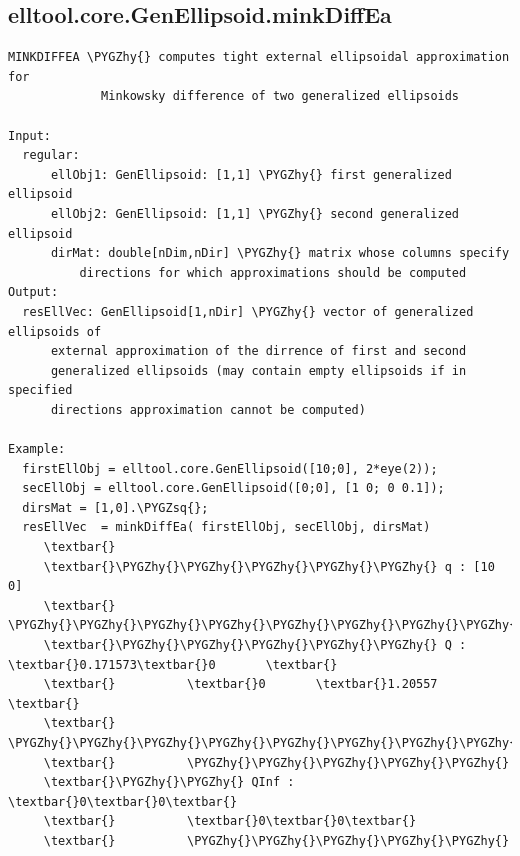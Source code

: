 \documentclass[letterpaper,10pt,english]{sphinxmanual}
\def\PYGZhy{\char`\-}
\def\PYGZsq{\char`\'}
\begin{document}
\subsection{elltool.core.GenEllipsoid.minkDiffEa}
\label{chap_functions:elltool-core-genellipsoid-minkdiffea}
\begin{Verbatim}[commandchars=\\\{\}]
MINKDIFFEA \PYGZhy{} computes tight external ellipsoidal approximation for
             Minkowsky difference of two generalized ellipsoids

Input:
  regular:
      ellObj1: GenEllipsoid: [1,1] \PYGZhy{} first generalized ellipsoid
      ellObj2: GenEllipsoid: [1,1] \PYGZhy{} second generalized ellipsoid
      dirMat: double[nDim,nDir] \PYGZhy{} matrix whose columns specify
          directions for which approximations should be computed
Output:
  resEllVec: GenEllipsoid[1,nDir] \PYGZhy{} vector of generalized ellipsoids of
      external approximation of the dirrence of first and second
      generalized ellipsoids (may contain empty ellipsoids if in specified
      directions approximation cannot be computed)

Example:
  firstEllObj = elltool.core.GenEllipsoid([10;0], 2*eye(2));
  secEllObj = elltool.core.GenEllipsoid([0;0], [1 0; 0 0.1]);
  dirsMat = [1,0].\PYGZsq{};
  resEllVec  = minkDiffEa( firstEllObj, secEllObj, dirsMat)
     \textbar{}
     \textbar{}\PYGZhy{}\PYGZhy{}\PYGZhy{}\PYGZhy{}\PYGZhy{} q : [10 0]
     \textbar{}          \PYGZhy{}\PYGZhy{}\PYGZhy{}\PYGZhy{}\PYGZhy{}\PYGZhy{}\PYGZhy{}\PYGZhy{}\PYGZhy{}\PYGZhy{}\PYGZhy{}\PYGZhy{}\PYGZhy{}\PYGZhy{}\PYGZhy{}\PYGZhy{}\PYGZhy{}\PYGZhy{}\PYGZhy{}
     \textbar{}\PYGZhy{}\PYGZhy{}\PYGZhy{}\PYGZhy{}\PYGZhy{} Q : \textbar{}0.171573\textbar{}0       \textbar{}
     \textbar{}          \textbar{}0       \textbar{}1.20557 \textbar{}
     \textbar{}          \PYGZhy{}\PYGZhy{}\PYGZhy{}\PYGZhy{}\PYGZhy{}\PYGZhy{}\PYGZhy{}\PYGZhy{}\PYGZhy{}\PYGZhy{}\PYGZhy{}\PYGZhy{}\PYGZhy{}\PYGZhy{}\PYGZhy{}\PYGZhy{}\PYGZhy{}\PYGZhy{}\PYGZhy{}
     \textbar{}          \PYGZhy{}\PYGZhy{}\PYGZhy{}\PYGZhy{}\PYGZhy{}
     \textbar{}\PYGZhy{}\PYGZhy{} QInf : \textbar{}0\textbar{}0\textbar{}
     \textbar{}          \textbar{}0\textbar{}0\textbar{}
     \textbar{}          \PYGZhy{}\PYGZhy{}\PYGZhy{}\PYGZhy{}\PYGZhy{}
\end{Verbatim}
\end{document}
